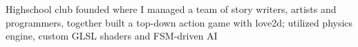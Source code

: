 \documentclass[letterpaper]{deedy-resume} %
\begin{document}
\begin{minipage}[t]{0.66\textwidth}
\sectionspace %


Highschool club founded where I managed a team of story writers, artists and programmers, together built a top-down action game with love2d; utilized physics engine, custom GLSL shaders and FSM-driven AI

\sectionspace %



\end{minipage} %








\end{document}
